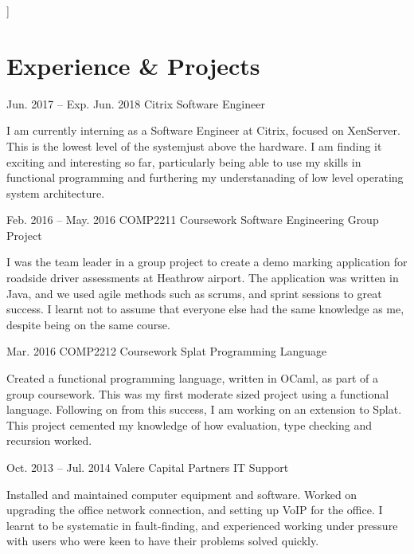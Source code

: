 \documentclass{tccv}
\begin{document}
\hline
\bigskip
]

\section{Experience \& Projects}

    \begin{eventlist}
        \item{Jun. 2017 -- Exp. Jun. 2018}
             {Citrix}
             {Software Engineer}

        I am currently interning as a Software Engineer at Citrix, focused on XenServer. This is the lowest level of the systemjust above the hardware. I am finding it exciting and interesting so far, particularly being able to use my skills in functional programming and furthering my understanading of low level operating system architecture.

        \item{Feb. 2016 -- May. 2016}
             {COMP2211 Coursework}
             {Software Engineering Group Project}

        I was the team leader in a group project to create a demo marking application for roadside driver assessments at Heathrow airport. The application was written in Java, and we used agile methods such as scrums, and sprint sessions to great success. I learnt not to assume that everyone else had the same knowledge as me, despite being on the same course.

        \item{Mar. 2016}
             {COMP2212 Coursework}
             {Splat Programming Language}

        Created a functional programming language, written in OCaml, as part of a group coursework. This was my first moderate sized project using a functional language. Following on from this success, I am working on an extension to Splat. This project cemented my knowledge of how evaluation, type checking and recursion worked.\newline\newline

        \item{Oct. 2013 -- Jul. 2014}
             {Valere Capital Partners}
             {IT Support}

        Installed and maintained computer equipment and software. Worked on upgrading the office network connection, and setting up VoIP for the office. I learnt to be systematic in fault-finding, and experienced working under pressure with users who were keen to have their problems solved quickly.



\end{eventlist}
\end{document}

